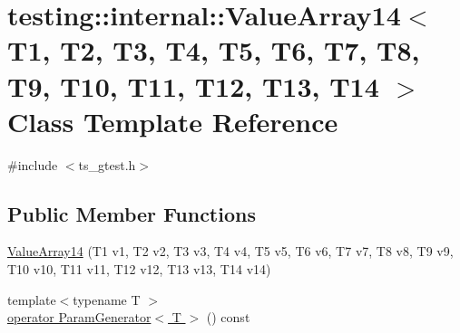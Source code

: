 \hypertarget{classtesting_1_1internal_1_1ValueArray14}{\section{testing\-:\-:internal\-:\-:Value\-Array14$<$ T1, T2, T3, T4, T5, T6, T7, T8, T9, T10, T11, T12, T13, T14 $>$ Class Template Reference}
\label{classtesting_1_1internal_1_1ValueArray14}
}


{\ttfamily \#include $<$ts\-\_\-gtest.\-h$>$}

\subsection*{Public Member Functions}
\begin{DoxyCompactItemize}
\item 
\hyperlink{classtesting_1_1internal_1_1ValueArray14_a07a09d64aba1260d403adc661546ce48}{Value\-Array14} (T1 v1, T2 v2, T3 v3, T4 v4, T5 v5, T6 v6, T7 v7, T8 v8, T9 v9, T10 v10, T11 v11, T12 v12, T13 v13, T14 v14)
\item 
{\footnotesize template$<$typename T $>$ }\\\hyperlink{classtesting_1_1internal_1_1ValueArray14_aab691578f146d26b5bfb5715ab6d1986}{operator Param\-Generator$<$ T $>$} () const 
\end{DoxyCompactItemize}


